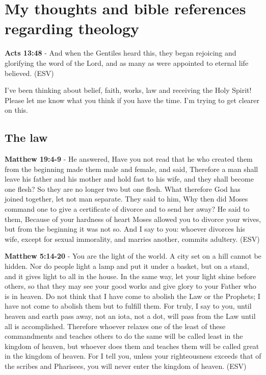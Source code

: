 \documentclass[11pt]{article}
\author{root}
\date{\today}
\title{}
\begin{document}
\section{My thoughts and bible references regarding theology}
\label{sec:orga6d5a66}
\textbf{Acts 13:48} - And when the Gentiles heard this, they began rejoicing and glorifying the word of the Lord, and as many as were appointed to eternal life believed. (ESV)

I've been thinking about belief, faith, works, law and receiving the Holy Spirit!
Please let me know what you think if you have the time.
I'm trying to get clearer on this.

\subsection{The law}
\label{sec:org9c9e829}

\textbf{Matthew 19:4-9} - He answered, Have you not read that he who created them from the beginning made them male and female, and said, Therefore a man shall leave his father and his mother and hold fast to his wife, and they shall become one flesh? So they are no longer two but one flesh. What therefore God has joined together, let not man separate. They said to him, Why then did Moses command one to give a certificate of divorce and to send her away? He said to them, Because of your hardness of heart Moses allowed you to divorce your wives, but from the beginning it was not so. And I say to you: whoever divorces his wife, except for sexual immorality, and marries another, commits adultery. (ESV)

\textbf{Matthew 5:14-20} - You are the light of the world. A city set on a hill cannot be hidden. Nor do people light a lamp and put it under a basket, but on a stand, and it gives light to all in the house. In the same way, let your light shine before others, so that they may see your good works and give glory to your Father who is in heaven. Do not think that I have come to abolish the Law or the Prophets; I have not come to abolish them but to fulfill them. For truly, I say to you, until heaven and earth pass away, not an iota, not a dot, will pass from the Law until all is accomplished. Therefore whoever relaxes one of the least of these commandments and teaches others to do the same will be called least in the kingdom of heaven, but whoever does them and teaches them will be called great in the kingdom of heaven. For I tell you, unless your righteousness exceeds that of the scribes and Pharisees, you will never enter the kingdom of heaven. (ESV)
\end{document}
